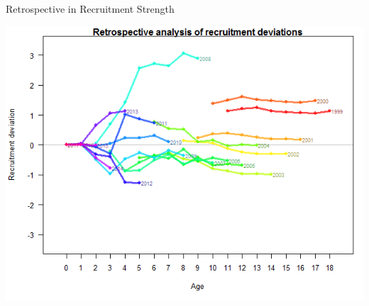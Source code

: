 \documentclass[pdf]{beamer}\usepackage[]{graphicx}\usepackage[]{color}
\begin{document}
\begin{frame}{Retrospective in Recruitment Strength}
  \begin{center}
    \includegraphics[scale = 0.40]{figures/retro_recdev_squid.png}
  \end{center}
\end{frame}
\end{document}
